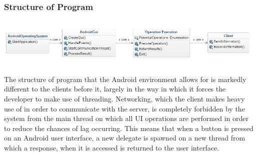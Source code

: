 \documentclass{article}
\begin{document}
\subsubsection{Structure of Program}
\includegraphics[width=\textwidth]{android.png}
The structure of program that the Android environment allows for is markedly different to the clients before it, largely in the way in which it forces the developer to make use of threading. Networking, which the client makes heavy use of in order to communicate with the server, is completely forbidden by the system from the main thread on which all UI operations are performed in order to reduce the chances of lag occurring. This means that when a button is pressed on an Android user interface, a new delegate is spawned on a new thread from which a response, when it is accessed is returned to the user interface.
\end{document}
